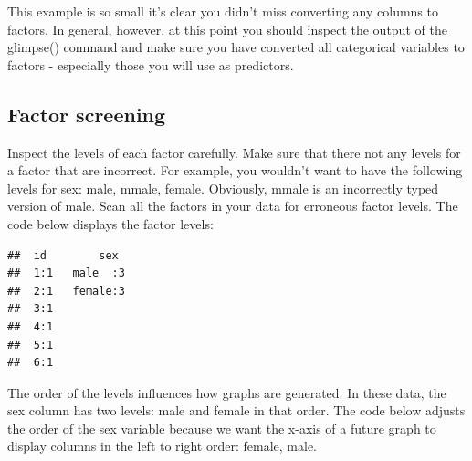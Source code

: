 \documentclass[
]{krantz}
\makeatletter
\newenvironment{Shaded}{\begin{snugshade}}{\end{snugshade}}
\newcommand{\DataTypeTok}[1]{\textcolor[rgb]{0.27,0.27,0.27}{#1}}
\newcommand{\KeywordTok}[1]{\textcolor[rgb]{0.27,0.27,0.27}{\textbf{#1}}}
\newcommand{\NormalTok}[1]{#1}
\newcommand{\OperatorTok}[1]{\textcolor[rgb]{0.43,0.43,0.43}{\textbf{#1}}}
\newcommand{\StringTok}[1]{\textcolor[rgb]{0.5,0.5,0.5}{#1}}
\newenvironment{kframe}{%
\medskip{}
\setlength{\fboxsep}{.8em}
 \def\at@end@of@kframe{}%
 \ifinner\ifhmode%
  \def\at@end@of@kframe{\end{minipage}}%
  \begin{minipage}{\columnwidth}%
 \fi\fi%
 \def\FrameCommand##1{\hskip\@totalleftmargin \hskip-\fboxsep
 \colorbox{shadecolor}{##1}\hskip-\fboxsep
     \hskip-\linewidth \hskip-\@totalleftmargin \hskip\columnwidth}%
 \MakeFramed {\advance\hsize-\width
   \@totalleftmargin\z@ \linewidth\hsize
   \@setminipage}}%
 {\par\unskip\endMakeFramed%
 \at@end@of@kframe}
\renewenvironment{Shaded}{\begin{kframe}}{\end{kframe}}
\makeatother
\begin{document}
This example is so small it's clear you didn't miss converting any columns to factors. In general, however, at this point you should inspect the output of the glimpse() command and make sure you have converted all categorical variables to factors - especially those you will use as predictors.

\hypertarget{factor-screening}{%
\subsection{Factor screening}\label{factor-screening}}

Inspect the levels of each factor carefully. Make sure that there not any levels for a factor that are incorrect. For example, you wouldn't want to have the following levels for sex: male, mmale, female. Obviously, mmale is an incorrectly typed version of male. Scan all the factors in your data for erroneous factor levels. The code below displays the factor levels:

\begin{Shaded}
\end{Shaded}

\begin{verbatim}
##  id        sex   
##  1:1   male  :3  
##  2:1   female:3  
##  3:1             
##  4:1             
##  5:1             
##  6:1
\end{verbatim}

The order of the levels influences how graphs are generated. In these data, the sex column has two levels: male and female in that order. The code below adjusts the order of the sex variable because we want the x-axis of a future graph to display columns in the left to right order: female, male.

\begin{Shaded}
\end{Shaded}
\end{document}
